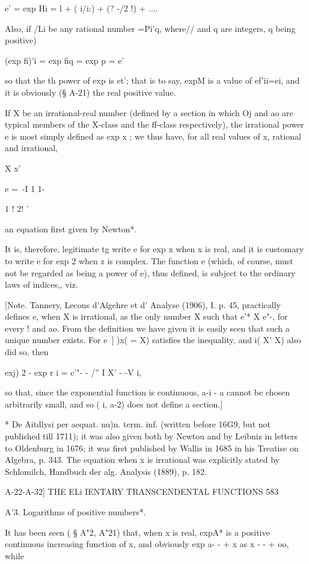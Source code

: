 e' = exp Hi = l + ( i/i:) + (? -/2 !) + ....

Also, if /Li be any rational number =Pi'q, where// and q are integers,
q being positive)

(exp fi)'i = exp fiq = exp p = e'\

so that the th power of exp is et'; that is to say, expM is a value
of ef'ii=ei, and it is obviously (§ A-21) the real positive value.

If X be an irrational-real number (defined by a section in which Oj
and ao are typical members of the X-class and the ff-class
respectively), the irrational power e is most simply defined as exp x
; we thus have, for all real values of x, rational and irrational,

X x'

e =\ -I 1 1-

1 ! 2! '

an equation first given by Newton*.

It is, therefore, legitimate tg write e for exp x when x is real, and
it is customary to write e for exp 2 when z is complex. The function e
(which, of course, must not be regarded as being a power of e), thus
defined, is subject to the ordinary laws of indices,, viz.

[Note. Tannery, Lecons d'Algehre et d' Analyse (1906), I. p. 45,
practically defines e, when X is irrational, as the only number X
such that e'* X e"-, for every ! and ao. From the definition we have
given it is easily seen that such a unique number exists. For e\ ] )x(
= X) satisfies the inequality, and i( X' X) also did so, then

exj) 2 - exp r i = c'"- - /'' I X' - -V i,

so that, since the exponential function is continuous, a-i - a cannot
be chosen arbitrarily small, and so ( i, a-2) does not define a
section.]

* De Aitdlysi per aequat. nu)n. term. inf. (written before 16G9, but
not published till 1711); it was also given both by Newtou and by
Leibniz in letters to Oldenburg in 1676; it was first published by
Wallis in 1685 in his Treatise on Algebra, p. 343. The equation when x
is irrational was explicitly stated by Schlomilch, Handbuch der alg.
Analysis (1889), p. 182.



A-22-A-32] THE ELi IENTARY TRANSCENDENTAL FUNCTIONS 583

A'3. Logarithms of positive numbers*.

It has been seen ( § A"2, A"21) that, when x is real, expA* is a
positive continuous increasing function of x, and obviously exp a- - +
x as x - - + oo, while

